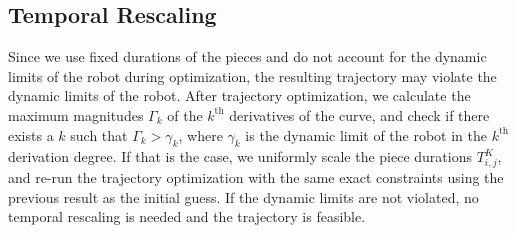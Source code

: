 \documentclass{svproc}
\newcommand{\vp}{\mathbf{p}}
\newcommand{\vg}{\mathbf{g}}
\newcommand{\vf}{\mathbf{f}}
\renewcommand{\th}{^{\text{th}}}
\begin{document}







\subsection{Temporal Rescaling}  \label{temporalRescaling} %
Since we use fixed durations of the pieces and do not account for the dynamic limits of the robot during optimization, the resulting trajectory may violate the dynamic limits of the robot.
After trajectory optimization, we calculate the maximum magnitudes $\Gamma_k$ of the $k\th$ derivatives of the curve, and check if there exists a $k$ such that $\Gamma_k > \gamma_k$, where $\gamma_k$ is the dynamic limit of the robot in the $k\th$ derivation degree.
If that is the case, we uniformly scale the piece durations $T^K_{i,j}$, and re-run the trajectory optimization with the same exact constraints using the previous result as the initial guess.
If the dynamic limits are not violated, no temporal rescaling is needed and the trajectory is feasible.
\end{document}
